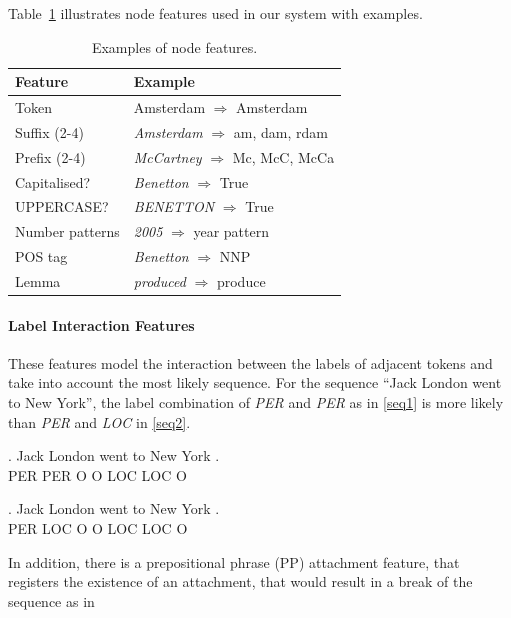 \documentclass[11pt]{article}
\begin{document}
Table~\ref{table:node} illustrates node features used in our system with examples.

\begin{table}[h!]
\small
\begin{tabular}{ l l }
\bf Feature & \bf Example \\
\hline
Token &  Amsterdam $\Rightarrow$ Amsterdam \\
Suffix (2-4)& \emph{Amsterdam}  $\Rightarrow$ am, dam, rdam\\
Prefix (2-4)&  \emph{McCartney}  $\Rightarrow$ Mc, McC, McCa\\
Capitalised?& \emph{Benetton}  $\Rightarrow$ True\\
UPPERCASE? &  \emph{BENETTON} $\Rightarrow$ True\\
Number patterns & \emph{2005}  $\Rightarrow$ year pattern\\
POS tag &  \emph{Benetton}  $\Rightarrow$  NNP   \\
Lemma & \emph{produced} $\Rightarrow$ produce \\

\end{tabular}


\caption{\normalsize Examples of node features.}
\label{table:node}
\end{table}

\paragraph*{Label Interaction Features}
These features model the interaction between the labels of adjacent tokens and take into account the most likely sequence. 
For the sequence ``Jack London went to New York'', the label combination of \emph{PER} and \emph{PER} as in \ref{seq1} is more likely than \emph{PER} and \emph{LOC} in \ref{seq2}.

\exg. Jack London went to New York .\\
      PER   PER   O    O  LOC LOC  O \\\label{seq1}

\exg. Jack London went to New York . \\ 
      PER  LOC    O    O  LOC LOC O \\\label{seq2}
      
In addition, there is a prepositional phrase (PP) attachment feature, that registers the existence of an attachment, that would
result in a break of the sequence as in
\end{document}
